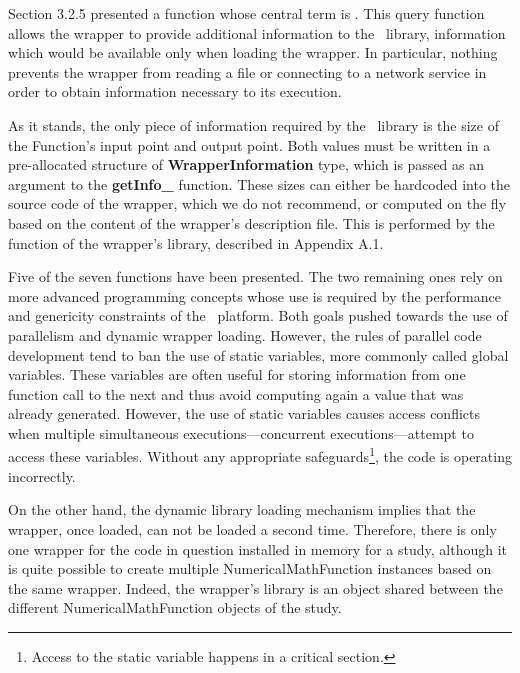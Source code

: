 Section 3.2.5 presented a function whose central term is . This query function allows the wrapper to provide additional information to the \OT\ library, information which would be available only when loading the wrapper. In particular, nothing prevents the wrapper from reading a file or connecting to a network service in order to obtain information necessary to its execution.

As it stands, the only piece of information required by the \OT\ library is the size of the Function's input point and output point. Both values must be written in a pre-allocated structure of {\bf WrapperInformation} type, which is passed as an argument to the {\bf getInfo\_} function. These sizes can either be hardcoded into the source code of the wrapper, which we do not recommend, or computed on the fly based on the content of the wrapper's description file. This is performed by the  function of the wrapper's library, described in Appendix A.1.

Five of the seven functions have been presented. The two remaining ones rely on more advanced programming concepts whose use is required by the performance and genericity constraints of the \OT\ platform. Both goals pushed towards the use of parallelism and dynamic wrapper loading. However, the rules of parallel code development tend to ban the use of static variables, more commonly called global variables. These variables are often useful for storing information from one function call to the next and thus avoid computing again a value that was already generated. However, the use of static variables causes access conflicts when multiple simultaneous executions---concurrent executions---attempt to access these variables. Without any appropriate safeguards\footnote{Access to the static variable happens in a critical section.}, the code is operating incorrectly.

On the other hand, the dynamic library loading mechanism implies that the wrapper, once loaded, can not be loaded a second time. Therefore, there is only one wrapper for the code in question installed in memory for a study, although it is quite possible to create multiple NumericalMathFunction instances based on the same wrapper. Indeed, the wrapper's library is an object shared between the different NumericalMathFunction objects of the study.

